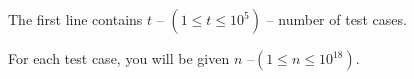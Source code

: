 The first line contains $t$ -- $(1 \le t \le 10^5)$ -- number of test cases.

For each test case, you will be given $n$ --$(1\le n \le 10^{18})$.
